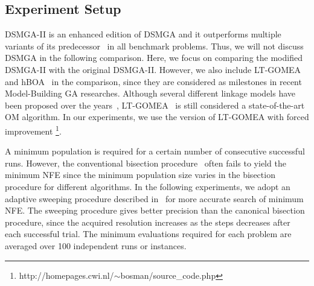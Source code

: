 \subsection{Experiment Setup}
DSMGA-II is an enhanced edition of DSMGA and it outperforms multiple variants of its predecessor~\cite{yu:DSMGA} in all benchmark problems. 
Thus, we will not discuss DSMGA in the following comparison.
Here, we focus on comparing the modified DSMGA-II with the original DSMGA-II.
However, we also include LT-GOMEA~\cite{bosman:LT-GOMEA} and hBOA~\cite{pelikan:hBOA} in the comparison, 
since they are considered as milestones in recent Model-Building GA researches.
Although several different linkage models have been proposed over the years~\cite{bosman:robust}, LT-GOMEA~\cite{bosman:LT-GOMEA} is still considered a state-of-the-art OM algorithm.
In our experiments, we use the version of LT-GOMEA with forced improvement \footnote{http://homepages.cwi.nl/$\sim$bosman/source\_code.php}.



A minimum population is required for a certain number of consecutive successful runs.
However, the conventional bisection procedure~\cite{pelikan:hBOA} often fails to yield the minimum NFE  since the minimum population size varies in the bisection procedure for different algorithms.
In the following experiments, we adopt an adaptive sweeping procedure described in~\cite{hsu:DSMGA2} for more accurate search of minimum NFE.
The sweeping procedure gives better precision than the canonical bisection procedure, since the acquired resolution increases as the steps decreases after each successful trial.
The minimum evaluations required for each problem are averaged over 100 independent runs or instances.


